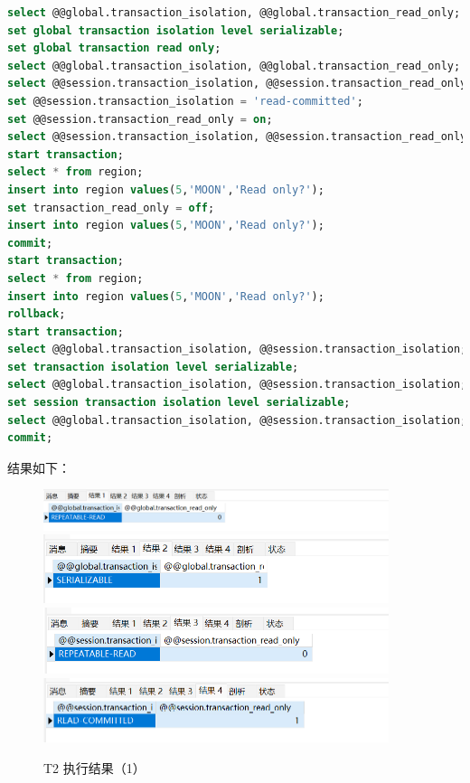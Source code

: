 \documentclass{article}
\begin{document}
\begin{lstlisting}[language=sql]
select @@global.transaction_isolation, @@global.transaction_read_only;
set global transaction isolation level serializable;
set global transaction read only;
select @@global.transaction_isolation, @@global.transaction_read_only;
select @@session.transaction_isolation, @@session.transaction_read_only;
set @@session.transaction_isolation = 'read-committed';
set @@session.transaction_read_only = on;
select @@session.transaction_isolation, @@session.transaction_read_only;
start transaction;
select * from region;
insert into region values(5,'MOON','Read only?');
set transaction_read_only = off;
insert into region values(5,'MOON','Read only?');
commit;
start transaction;
select * from region;
insert into region values(5,'MOON','Read only?');
rollback;
start transaction;
select @@global.transaction_isolation, @@session.transaction_isolation;
set transaction isolation level serializable;
select @@global.transaction_isolation, @@session.transaction_isolation;
set session transaction isolation level serializable;
select @@global.transaction_isolation, @@session.transaction_isolation;
commit;
\end{lstlisting}

结果如下：

\begin{figure}[H]
  \centering
  \includegraphics[width=0.9\textwidth]{img/37.png}
  \includegraphics[width=0.9\textwidth]{img/38.png}
  \includegraphics[width=0.9\textwidth]{img/39.png}
  \includegraphics[width=0.9\textwidth]{img/40.png}
  \caption{T2 执行结果（1）}
\end{figure}
\end{document}
